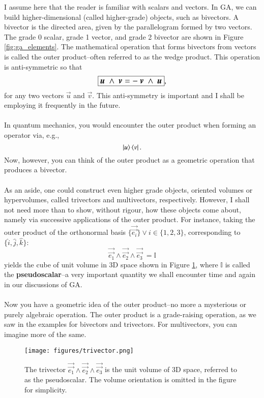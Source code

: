 I assume here that the reader is familiar with scalars and vectors. In GA, we can build higher-dimensional (called higher-grade) objects, such as bivectors. A bivector is the directed area, given by the parallelogram formed by two vectors. The grade 0 scalar, grade 1 vector, and grade 2 bivector are shown in Figure \ref{fig:ga_elements}. The mathematical operation that forms bivectors from vectors is called the outer product--often referred to as the wedge product. This operation is anti-symmetric so that 
\begin{equation} \label{eq:outer_product}
    \large\boxed{\vec{u} \ \wedge \ \vec{v} = - \ \vec{v} \ \wedge \ \vec{u} },
\end{equation}
for any two vectors $\vec{u}$ and $\vec{v}$. This anti-symmetry is important and I shall be employing it frequently in the future.
\\ \\
In quantum mechanics, you would encounter the outer product when forming an operator via, e.g.,
$$ \ket{u} \bra{v} .$$
Now, however, you can think of the outer product as a geometric operation that produces a bivector.
\\ \\
As an aside, one could construct even higher grade objects, oriented volumes or hypervolumes, called trivectors and multivectors, respectively. However, I shall not need more than to show, without rigour, how these objects come about, namely via successive applications of the outer product. For instance, taking the outer product of the  orthonormal basis $\{ \vec{\vec{e_i}} \} \vee i \in \{ 1, 2,3\} $, corresponding to $ \{ \hat{i}, \hat{j}, \hat{k} \}$:
\begin{equation} \label{eq:pseudoscalar_wedge_definition}
   \vec{\vec{e_1}} \wedge \vec{\vec{e_2}} \wedge \vec{\vec{e_3}} \ = \mathbb{I}  
\end{equation}
yields the cube of unit volume in 3D space shown in Figure \ref{fig:trivector}, where $\mathbb{I}$ is called the \textbf{pseudoscalar}--a very important quantity we shall encounter time and again in our discussions of GA.
\\ \\
Now you have a geometric idea of the outer product--no more a mysterious or purely algebraic operation. The outer product is a grade-raising operation, as we saw in the examples for bivectors and trivectors. For multivectors, you can imagine more of the same.

\begin{figure}[H]
   \centering
   \texttt{[image: figures/trivector.png]}
   \caption{The trivector $\vec{\vec{e_1}} \wedge \vec{\vec{e_2}} \wedge \vec{\vec{e_3}}$ is the unit volume of 3D space, referred to as the pseudoscalar. The volume orientation is omitted in the figure for simplicity.}
   \label{fig:trivector}
\end{figure}
   


